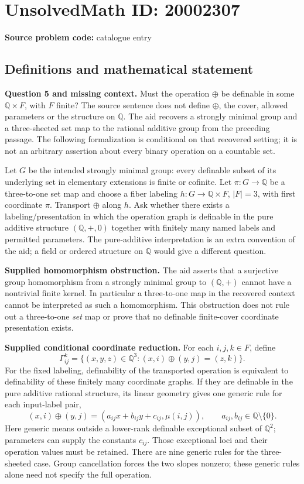 \documentclass[11pt]{article}
\newcommand{\Q}{\mathbb{Q}}
\begin{document}
\section*{UnsolvedMath ID: 20002307}
\textbf{Source problem code:} catalogue entry
\subsection{Definitions and mathematical statement}
\textbf{Question 5 and missing context.} Must the operation $\oplus$ be definable in some $\Q\times F$, with $F$ finite? The source sentence does not define $\oplus$, the cover, allowed parameters or the structure on $\Q$. The aid recovers a strongly minimal group and a three-sheeted set map to the rational additive group from the preceding passage. The following formalization is conditional on that recovered setting; it is not an arbitrary assertion about every binary operation on a countable set.

Let $G$ be the intended strongly minimal group: every definable subset of its underlying set in elementary extensions is finite or cofinite. Let $\pi:G\to\Q$ be a three-to-one set map and choose a fiber labeling $h:G\to\Q\times F$, $|F|=3$, with first coordinate $\pi$. Transport $\oplus$ along $h$. Ask whether there exists a labeling/presentation in which the operation graph is definable in the pure additive structure $(\Q,+,0)$ together with finitely many named labels and permitted parameters. The pure-additive interpretation is an extra convention of the aid; a field or ordered structure on $\Q$ would give a different question.

\textbf{Supplied homomorphism obstruction.} The aid asserts that a surjective group homomorphism from a strongly minimal group to $(\Q,+)$ cannot have a nontrivial finite kernel. In particular a three-to-one map in the recovered context cannot be interpreted as such a homomorphism. This obstruction does not rule out a three-to-one \emph{set} map or prove that no definable finite-cover coordinate presentation exists.

\textbf{Supplied conditional coordinate reduction.} For each $i,j,k\in F$, define
\[
 \Gamma_{ij}^k=\{(x,y,z)\in\Q^3:(x,i)\oplus(y,j)=(z,k)\}.
\]
For the fixed labeling, definability of the transported operation is equivalent to definability of these finitely many coordinate graphs. If they are definable in the pure additive rational structure, its linear geometry gives one generic rule for each input-label pair,
\[
 (x,i)\oplus(y,j)
     =(a_{ij}x+b_{ij}y+c_{ij},\mu(i,j)),
 \qquad a_{ij},b_{ij}\in\Q\setminus\{0\}.
\]
Here generic means outside a lower-rank definable exceptional subset of $\Q^2$; parameters can supply the constants $c_{ij}$. Those exceptional loci and their operation values must be retained. There are nine generic rules for the three-sheeted case. Group cancellation forces the two slopes nonzero; these generic rules alone need not specify the full operation.
\end{document}
